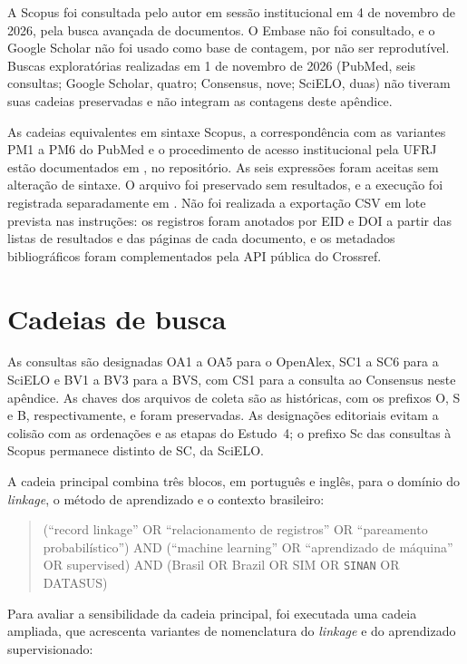 A Scopus foi consultada pelo autor em sessão institucional em 4 de novembro de 2026, pela busca avançada de documentos. O Embase não foi consultado, e o Google Scholar não foi usado como base de contagem, por não ser reprodutível. Buscas exploratórias realizadas em 1 de novembro de 2026 (PubMed, seis consultas; Google Scholar, quatro; Consensus, nove; SciELO, duas) não tiveram suas cadeias preservadas e não integram as contagens deste apêndice.

As cadeias equivalentes em sintaxe Scopus, a correspondência com as variantes PM1 a PM6 do PubMed e o procedimento de acesso institucional pela UFRJ estão documentados em , no repositório. As seis expressões foram aceitas sem alteração de sintaxe. O arquivo  foi preservado sem resultados, e a execução foi registrada separadamente em . Não foi realizada a exportação CSV em lote prevista nas instruções: os registros foram anotados por EID e DOI a partir das listas de resultados e das páginas de cada documento, e os metadados bibliográficos foram complementados pela API pública do Crossref.

\section{Cadeias de busca}

As consultas são designadas OA1 a OA5 para o OpenAlex, SC1 a SC6 para a SciELO e BV1 a BV3 para a BVS, com CS1 para a consulta ao Consensus neste apêndice. As chaves dos arquivos de coleta são as históricas, com os prefixos O, S e B, respectivamente, e foram preservadas. As designações editoriais evitam a colisão com as ordenações e as etapas do Estudo~4; o prefixo Sc das consultas à Scopus permanece distinto de SC, da SciELO.

A cadeia principal combina três blocos, em português e inglês, para o domínio do \textit{linkage}, o método de aprendizado e o contexto brasileiro:

\begin{quote}
\small
(``record linkage'' OR ``relacionamento de registros'' OR ``pareamento probabilístico'') AND (``machine learning'' OR ``aprendizado de máquina'' OR supervised) AND (Brasil OR Brazil OR SIM OR \texttt{SINAN} OR DATASUS)
\end{quote}

Para avaliar a sensibilidade da cadeia principal, foi executada uma cadeia ampliada, que acrescenta variantes de nomenclatura do \textit{linkage} e do aprendizado supervisionado:

